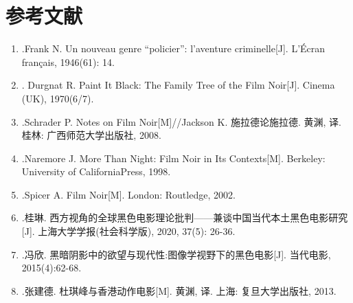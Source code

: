 \documentclass[11pt]{article}
\begin{document}
\section*{参考文献}
\begin{enumerate}
  \item [1].Frank N. Un nouveau genre “policier”: l’aventure criminelle[J]. L’Écran français, 1946(61): 14.
  \item [2]. Durgnat R. Paint It Black: The Family Tree of the Film Noir[J]. Cinema (UK), 1970(6/7).
  \item [3].Schrader P. Notes on Film Noir[M]//Jackson K. 施拉德论施拉德. 黄渊, 译. 桂林: 广西师范大学出版社, 2008.
  \item [4].Naremore J. More Than Night: Film Noir in Its Contexts[M]. Berkeley: University of CaliforniaPress, 1998.
  \item [5].Spicer A. Film Noir[M]. London: Routledge, 2002.
  \item [6].桂琳. 西方视角的全球黑色电影理论批判——兼谈中国当代本土黑色电影研究[J]. 上海大学学报(社会科学版), 2020, 37(5): 26-36.
  \item [7].冯欣. 黑暗阴影中的欲望与现代性:图像学视野下的黑色电影[J]. 当代电影, 2015(4):62-68.
  \item [8].张建德. 杜琪峰与香港动作电影[M]. 黄渊, 译. 上海: 复旦大学出版社, 2013.
\end{enumerate}
\end{document}
